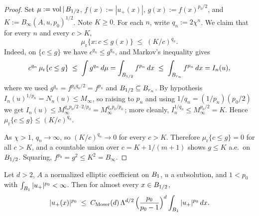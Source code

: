\begin{proof}
\leanok
{}

Set $\mu := \mathrm{vol}\,|\,B_{1/2}$, $f(x) := |u_+(x)|$, $g(x) := f(x)^{p_0/2}$,
and $K := B_\infty(A,u,p_0)^{1/2}$. Note $K \geq 0$.
For each $n$, write $q_n := 2 \chi^n$. We claim that for every $n$
and every $c > K$,
\begin{equation*}
  \mu_{\mathrm{r}}\{x : c \leq g(x)\} \;\leq\; (K/c)^{q_n}.
\end{equation*}
Indeed, on $\{c \leq g\}$ we have $c^{q_n} \leq g^{q_n}$, and Markov's
inequality gives
\begin{equation*}
  c^{q_n}\,\mu_{\mathrm{r}}\{c \leq g\}
  \;\leq\;
  \int g^{q_n}\,d\mu
  = \int_{B_{1/2}} f^{p_n}\,dx
  \;\leq\;
  \int_{B_{r_n}} f^{p_n}\,dx = I_n(u),
\end{equation*}
where we used $g^{q_n} = f^{p_0 q_n / 2} = f^{p_n}$ and
$B_{1/2} \subseteq B_{r_n}$. By hypothesis $I_n(u)^{1/p_n} = N_n(u) \leq
M_\infty$, so raising to $p_n$ and using $1/q_n = (1/p_n)(p_0/2)$ we get
$I_n(u) \leq M_\infty^{q_n p_0/2 \cdot 2/p_0} = M_\infty^{q_n p_0/p_0}$\,;
more cleanly, $I_n^{1/q_n} \leq M_\infty^{p_0/2} = K$. Hence
$\mu_{\mathrm{r}}\{c\leq g\} \leq (K/c)^{q_n}$.

As $\chi > 1$, $q_n \to \infty$, so $(K/c)^{q_n} \to 0$ for every $c > K$.
Therefore $\mu_{\mathrm{r}}\{c \leq g\} = 0$ for all $c > K$, and a countable
union over $c = K + 1/(m+1)$ shows $g \leq K$ a.e.\ on $B_{1/2}$. Squaring,
$f^{p_0} = g^{2} \leq K^{2} = B_\infty$.
\end{proof}

\begin{theorem}
\label{thm:linfty-Moser}
\leanok
{}
Let $d > 2$, $A$ a normalized elliptic coefficient on $B_{1}$, $u$ a
subsolution, and $1 < p_0$ with $\int_{B_{1}} |u_+|^{p_0} < \infty$. Then for
almost every $x \in B_{1/2}$,
\begin{equation*}
  |u_+(x)|^{p_0}
  \;\leq\;
  C_{\mathrm{Moser}}(d)\,\Lambda^{d/2}\,
  \Big(\frac{p_0}{p_0-1}\Big)^{d}
  \int_{B_{1}} |u_+|^{p_0}\,dx.
\end{equation*}
\end{theorem}

